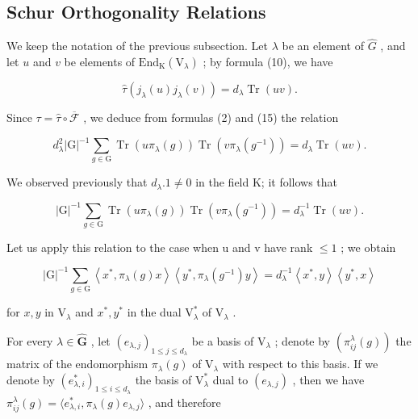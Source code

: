 \subsection{Schur Orthogonality Relations}

We keep the notation of the previous subsection. Let \(\lambda\) be an element of \(\widehat{G}\) , and let \(u\) and \(v\) be elements of \(\mathrm{End}_{\mathrm{K}}(\mathrm{V}_{\lambda})\) ; by formula (10), we have

\[
\hat {\tau} (j _ {\lambda} (u) j _ {\lambda} (v)) = d _ {\lambda} \operatorname{Tr} (u v).
\]

Since \(\tau = \hat{\tau} \circ \overline{\mathcal{F}}\) , we deduce from formulas (2) and (15) the relation

\[
d _ {\lambda} ^ {2} | \mathrm{G} | ^ {- 1} \sum_ {g \in \mathrm{G}} \operatorname{Tr} (u \pi_ {\lambda} (g)) \operatorname{Tr} (v \pi_ {\lambda} (g ^ {- 1})) = d _ {\lambda} \operatorname{Tr} (u v).
\]

We observed previously that \(d_{\lambda}.1 \neq 0\) in the field K; it follows that

\[
| \mathrm{G} | ^ {- 1} \sum_ {g \in \mathrm{G}} \operatorname{Tr} (u \pi_ {\lambda} (g)) \operatorname{Tr} (v \pi_ {\lambda} (g ^ {- 1})) = d _ {\lambda} ^ {- 1} \operatorname{Tr} (u v).\tag{20}
\]

Let us apply this relation to the case when u and v have rank \(\leqslant 1\) ; we obtain

\[
| \mathrm{G} | ^ {- 1} \sum_ {g \in \mathrm{G}} \left\langle x ^ {*}, \pi_ {\lambda} (g) x \right\rangle \left\langle y ^ {*}, \pi_ {\lambda} \left(g ^ {- 1}\right) y \right\rangle = d _ {\lambda} ^ {- 1} \left\langle x ^ {*}, y \right\rangle \left\langle y ^ {*}, x \right\rangle\tag{21}
\]

for \(x, y\) in \(\mathrm{V}_{\lambda}\) and \(x^{*}, y^{*}\) in the dual \(\mathrm{V}_{\lambda}^{*}\) of \(\mathrm{V}_{\lambda}\) .

For every \(\lambda \in \widehat{\mathbf{G}}\) , let \((e_{\lambda,j})_{1\leqslant j\leqslant d_{\lambda}}\) be a basis of \(\mathrm{V}_{\lambda}\) ; denote by \((\pi_{ij}^{\lambda}(g))\) the matrix of the endomorphism \(\pi_{\lambda}(g)\) of \(\mathrm{V}_{\lambda}\) with respect to this basis. If we denote by \((e_{\lambda,i}^{*})_{1\leqslant i\leqslant d_{\lambda}}\) the basis of \(\mathrm{V}_{\lambda}^{*}\) dual to \((e_{\lambda,j})\) , then we have \(\pi_{ij}^{\lambda}(g) = \langle e_{\lambda,i}^{*}, \pi_{\lambda}(g)e_{\lambda,j}\rangle\) , and therefore

